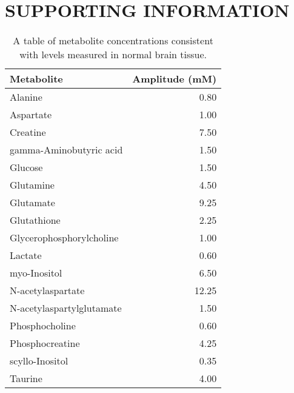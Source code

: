 \documentclass[num-refs]{wiley-article}
\begin{document}
\section*{SUPPORTING INFORMATION}

\begin{table}[ht]
\begin{center}
\begin{tabular}{l r}
  \hline
  Metabolite & Amplitude (mM) \\
  \hline
  Alanine & 0.80 \\
  Aspartate & 1.00 \\
  Creatine & 7.50 \\
  gamma-Aminobutyric acid & 1.50 \\
  Glucose & 1.50 \\
  Glutamine & 4.50 \\
  Glutamate & 9.25 \\
  Glutathione & 2.25 \\
  Glycerophosphorylcholine & 1.00 \\
  Lactate & 0.60 \\
  myo-Inositol & 6.50 \\
  N-acetylaspartate & 12.25 \\
  N-acetylaspartylglutamate & 1.50 \\
  Phosphocholine & 0.60 \\
  Phosphocreatine & 4.25 \\
  scyllo-Inositol & 0.35 \\
  Taurine & 4.00 \\
  \hline
\end{tabular}
\end{center}
\caption{A table of metabolite concentrations consistent with levels measured in normal brain tissue.}
\label{metab_tab}
\end{table}
\end{document}
